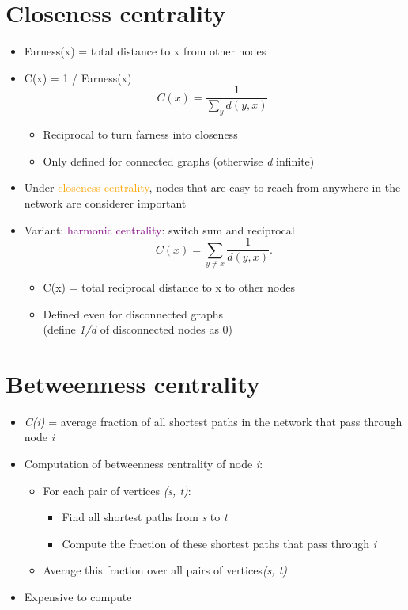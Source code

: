 \documentclass[11pt]{article}
\begin{document}
\section*{Closeness centrality}
\begin{itemize}
	\item Farness(x) = total distance to x from other nodes
	\item C(x) = 1 / Farness(x) \\
		\[
			C(x) = \frac{1}{\sum_y d(y, x)}
		.\] 
		\begin{itemize}
			\item Reciprocal to turn farness into closeness
			\item Only defined for connected graphs (otherwise \textit{d} infinite)
		\end{itemize}
	\item Under \textcolor{orange}{closeness centrality}, nodes that are easy to reach from anywhere in the network are considerer important
	\item Variant: \textcolor{purple}{harmonic centrality}: switch sum and reciprocal \\
		\[
			C(x) = \sum\limits_{y \neq x} \frac{1}{d(y, x)}
		.\] 
		\begin{itemize}
			\item C(x) = total reciprocal distance to x to other nodes
			\item Defined even for disconnected graphs \\
			(define \textit{1/d} of disconnected nodes as 0)
		\end{itemize}	
\end{itemize}

\section*{Betweenness centrality}
\begin{itemize}
	\item \textit{C(i)} = average fraction of all shortest paths in the network that pass through node \textit{i}
	\item Computation of betweenness centrality of node \textit{i}:
		\begin{itemize}
			\item For each pair of vertices \textit{(s, t)}: 
				\begin{itemize}
					\item Find all shortest paths from \textit{s} to \textit{t}
					\item Compute the fraction of these shortest paths that pass through \textit{i}
				\end{itemize}
			\item Average this fraction over all pairs of vertices\textit{(s, t)}
		\end{itemize}
	\item Expensive to compute
\end{itemize}
\end{document}
